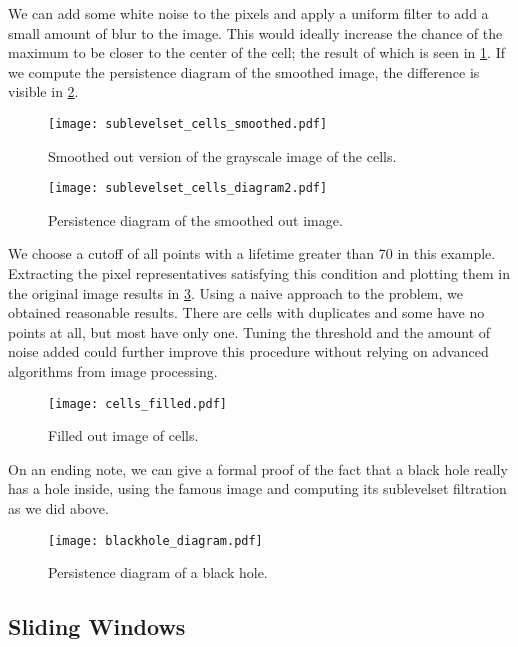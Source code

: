 We can add some white noise to the pixels and apply a uniform filter to add a small amount of blur to the image. This would ideally increase the chance of the maximum to be closer to the center of the cell; the result of which is seen in \ref{fig:cells_smoothed}. If we compute the persistence diagram of the smoothed image, the difference is visible in \ref{fig:cells_diagram2}.

\begin{figure}[h!]
  \centering
  \texttt{[image: sublevelset\_cells\_smoothed.pdf]}
  \caption{Smoothed out version of the grayscale image of the cells.}
  \label{fig:cells_smoothed}
\end{figure}

\begin{figure}[h!]
  \centering
  \texttt{[image: sublevelset\_cells\_diagram2.pdf]}
  \caption{Persistence diagram of the smoothed out image.}
  \label{fig:cells_diagram2}
\end{figure}

We choose a cutoff of all points with a lifetime greater than 70 in this example. Extracting the pixel representatives satisfying this condition and plotting them in the original image results in \ref{fig:cells_filled}. Using a naive approach to the problem, we obtained reasonable results. There are cells with duplicates and some have no points at all, but most have only one. Tuning the threshold and the amount of noise added could further improve this procedure without relying on advanced algorithms from image processing.

\begin{figure}[h!]
  \centering
  \texttt{[image: cells\_filled.pdf]}
  \caption{Filled out image of cells.}
  \label{fig:cells_filled}
\end{figure}

On an ending note, we can give a formal proof of the fact that a black hole really has a hole inside, using the famous image and computing its sublevelset filtration as we did above.

\begin{figure}[h!]
  \centering
  \texttt{[image: blackhole\_diagram.pdf]}
  \caption{Persistence diagram of a black hole.}
  \label{fig:black_hole}
\end{figure}

\subsection{Sliding Windows}

